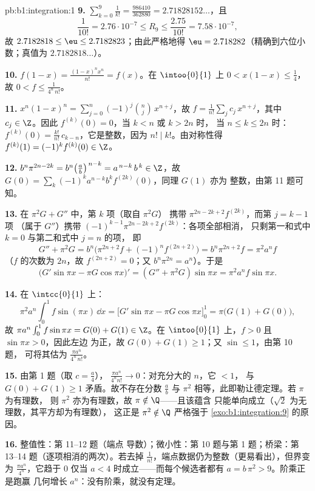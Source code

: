 \begin{solution}{pb:b1:integration:1}
\textbf{9.} $\sum_{k=0}^{9} \frac{1}{k!} = \frac{986410}{362880}
= 2.71828152\dots$，且
\[
\frac{1}{10!} = 2.76\cdot10^{-7} \leq R_9 \leq
\frac{2.75}{10!} = 7.58\cdot10^{-7} ,
\]
故 $2.7182818 \leq \eu \leq 2.7182823$；由此严格地得 $\eu =
2.718282$（精确到六位小数；真值为 $2.7182818\dots$）。

\textbf{10.} $f(1 - x) = \frac{(1-x)^n x^n}{n!} = f(x)$。在
$\intoo{0}{1}$ 上 $0 < x(1-x) \leq \frac14$，故 $0 < f \leq
\frac{1}{4^n\,n!}$。

\textbf{11.} $x^n(1-x)^n = \sum_{j=0}^{n} (-1)^j\binom
nj\,x^{n+j}$，故 $f = \frac{1}{n!}\sum_j c_j\,x^{n+j}$，其中
$c_j \in \Z$。因此 $f^{(k)}(0) = 0$，当 $k < n$ 或 $k > 2n$ 时，
当 $n \leq k \leq 2n$ 时：$f^{(k)}(0) = \frac{k!}{n!}\,
c_{k-n}$，它是整数，因为 $n! \mid k!$。由对称性得
$f^{(k)}(1) = (-1)^k f^{(k)}(0) \in \Z$。

\textbf{12.} $b^n \pi^{2n-2k} = b^n\bigl(\frac
ab\bigr)^{\,n-k} = a^{\,n-k}\,b^{\,k} \in \Z$，故 $G(0) =
\sum_k (-1)^k a^{n-k} b^k f^{(2k)}(0)$，同理 $G(1)$ 亦为
整数，由第 11 题可知。

\textbf{13.} 在 $\pi^2 G + G''$ 中，第 $k$ 项（取自 $\pi^2 G$）
携带 $\pi^{2n-2k+2}f^{(2k)}$，而第 $j = k - 1$ 项
（属于 $G''$）携带 $(-1)^{k-1}\pi^{2n-2k+2}f^{(2k)}$：各项全部相消，
只剩第一和式中 $k = 0$ 与第二和式中 $j = n$ 的项，
即
\[
G'' + \pi^2 G = b^n\bigl(\pi^{2n+2} f + (-1)^n f^{(2n+2)}\bigr)
= b^n \pi^{2n+2} f = \pi^2 a^n f
\]
（$f$ 的次数为 $2n$，故 $f^{(2n+2)} = 0$；又 $b^n\pi^{2n} =
a^n$）。于是
\[
\bigl(G'\sin\pi x - \pi G\cos\pi x\bigr)'
= (G'' + \pi^2 G)\sin \pi x = \pi^2 a^n f\sin\pi x .
\]

\textbf{14.} 在 $\intcc{0}{1}$ 上：
\[
\pi^2 a^n \int_0^1 f\sin(\pi x)\,\dd x
= \bigl[G'\sin\pi x - \pi G\cos\pi x\bigr]_0^1
= \pi\bigl(G(1) + G(0)\bigr) ,
\]
故 $\pi a^n \int_0^1 f\sin\pi x = G(0) + G(1) \in \Z$。在
$\intoo{0}{1}$ 上，$f > 0$ 且 $\sin\pi x > 0$，因此左边
为正，故 $G(0) + G(1) \geq 1$；又 $\sin \leq 1$，由第 10 题，
可将其估为 $\frac{\pi a^n}{4^n\,n!}$。

\textbf{15.} 由第 1 题（取 $c = \frac a4$），
$\frac{\pi a^n}{4^n n!} \to 0$：对充分大的 $n$，它 $< 1$，
与 $G(0) + G(1) \geq 1$ 矛盾。故不存在分数 $\frac ab$
与 $\pi^2$ 相等，此即勒让德定理。若 $\pi$ 为有理数，
则 $\pi^2$ 亦为有理数，故 $\pi \notin \Q$——且该蕴含
只能单向成立（$\sqrt2$ 为无理数，其平方却为有理数），
这正是 $\pi^2 \notin \Q$ 严格强于
\cref{exo:b1:integration:9} 的原因。

\textbf{16.} 整值性：第 11--12 题（端点
导数）；微小性：第 10 题与第 1 题；桥梁：第
13--14 题（逐项相消的两次）。若去掉
$\frac{1}{n!}$，端点数据仍为整数（更易看出），但界变为
$\frac{\pi a^n}{4^n}$，它趋于 $0$ 仅当
$a < 4$ 时成立——而每个候选者都有 $a =
b\,\pi^2 > 9$。阶乘正是跑赢
几何增长 $a^n$：没有阶乘，就没有定理。


\end{solution}
